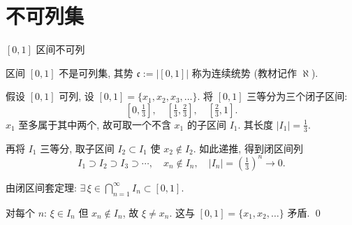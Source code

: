 \section{不可列集}


\begin{frame}{$[0,1]$ 区间不可列}

\begin{thm}
区间 $[0,1]$ 不是可列集, 其势 $\mathfrak{c} := |[0,1]|$ 称为\alert{连续统势} (教材记作 $\aleph$).
\end{thm}

\pause

\startproof[bg=yellow, fg=red]
假设 $[0,1]$ 可列, 设 $[0,1] = \{ x_1, x_2, x_3, \ldots \}$. 将 $[0,1]$ 三等分为三个闭子区间:
\[
\left[0, \tfrac{1}{3}\right], \quad \left[\tfrac{1}{3}, \tfrac{2}{3}\right], \quad \left[\tfrac{2}{3}, 1\right].
\]
$x_1$ 至多属于其中两个, 故可取一个不含 $x_1$ 的子区间 $I_1$. 其长度 $|I_1| = \tfrac{1}{3}$.

\pause

再将 $I_1$ 三等分, 取子区间 $I_2 \subset I_1$ 使 $x_2 \notin I_2$. 如此递推, 得到闭区间列
\[
I_1 \supset I_2 \supset I_3 \supset \cdots, \quad x_n \notin I_n, \quad |I_n| = \left(\tfrac{1}{3}\right)^n \to 0.
\]

\pause

由\alert{闭区间套定理}: $\exists\, \xi \in \displaystyle\bigcap_{n=1}^{\infty} I_n \subset [0,1].$

对每个 $n$: $\xi \in I_n$ 但 $x_n \notin I_n$, 故 $\xi \neq x_n$. 这与 $[0,1] = \{ x_1, x_2, \ldots \}$ 矛盾.
\qed

\end{frame}


